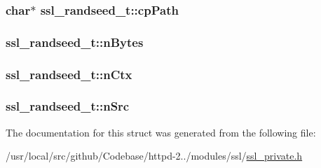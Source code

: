 \subsubsection[{\texorpdfstring{cp\+Path}{cpPath}}]{\setlength{\rightskip}{0pt plus 5cm}char$\ast$ ssl\+\_\+randseed\+\_\+t\+::cp\+Path}\hypertarget{structssl__randseed__t_a609e0b7b2a35df6e73aab906e1ca8b34}{}\label{structssl__randseed__t_a609e0b7b2a35df6e73aab906e1ca8b34}
\subsubsection[{\texorpdfstring{n\+Bytes}{nBytes}}]{ ssl\+\_\+randseed\+\_\+t\+::n\+Bytes}\hypertarget{structssl__randseed__t_adf0224c594bfffd1556f8e970d51fbb9}{}\label{structssl__randseed__t_adf0224c594bfffd1556f8e970d51fbb9}
\subsubsection[{\texorpdfstring{n\+Ctx}{nCtx}}]{ ssl\+\_\+randseed\+\_\+t\+::n\+Ctx}\hypertarget{structssl__randseed__t_afa8456f8bf6cb43388c12ca4e50b8fe4}{}\label{structssl__randseed__t_afa8456f8bf6cb43388c12ca4e50b8fe4}
\subsubsection[{\texorpdfstring{n\+Src}{nSrc}}]{ ssl\+\_\+randseed\+\_\+t\+::n\+Src}\hypertarget{structssl__randseed__t_af1d3a2bb8da081095e00edb1a2362e75}{}\label{structssl__randseed__t_af1d3a2bb8da081095e00edb1a2362e75}


The documentation for this struct was generated from the following file\+:\begin{DoxyCompactItemize}
\item 
/usr/local/src/github/\+Codebase/httpd-\/2../modules/ssl/\hyperlink{ssl__private_8h}{ssl\+\_\+private.\+h}\end{DoxyCompactItemize}
